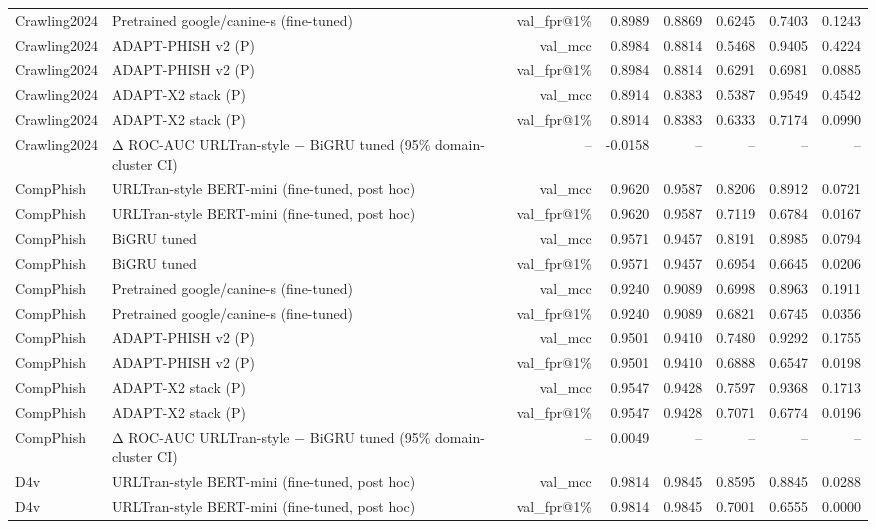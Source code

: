 \begin{table}[t]
\begin{tabular}{llrrrrrr}
Crawling2024 & Pretrained google/canine-s (fine-tuned) & val\_fpr@1\% & 0.8989 & 0.8869 & 0.6245 & 0.7403 & 0.1243 \\
Crawling2024 & ADAPT-PHISH v2 (P) & val\_mcc & 0.8984 & 0.8814 & 0.5468 & 0.9405 & 0.4224 \\
Crawling2024 & ADAPT-PHISH v2 (P) & val\_fpr@1\% & 0.8984 & 0.8814 & 0.6291 & 0.6981 & 0.0885 \\
Crawling2024 & ADAPT-X2 stack (P) & val\_mcc & 0.8914 & 0.8383 & 0.5387 & 0.9549 & 0.4542 \\
Crawling2024 & ADAPT-X2 stack (P) & val\_fpr@1\% & 0.8914 & 0.8383 & 0.6333 & 0.7174 & 0.0990 \\
Crawling2024 & Δ ROC-AUC URLTran-style − BiGRU tuned (95\% domain-cluster CI) & -- & -0.0158 & -- & -- & -- & -- \\
CompPhish & URLTran-style BERT-mini (fine-tuned, post hoc) & val\_mcc & 0.9620 & 0.9587 & 0.8206 & 0.8912 & 0.0721 \\
CompPhish & URLTran-style BERT-mini (fine-tuned, post hoc) & val\_fpr@1\% & 0.9620 & 0.9587 & 0.7119 & 0.6784 & 0.0167 \\
CompPhish & BiGRU tuned & val\_mcc & 0.9571 & 0.9457 & 0.8191 & 0.8985 & 0.0794 \\
CompPhish & BiGRU tuned & val\_fpr@1\% & 0.9571 & 0.9457 & 0.6954 & 0.6645 & 0.0206 \\
CompPhish & Pretrained google/canine-s (fine-tuned) & val\_mcc & 0.9240 & 0.9089 & 0.6998 & 0.8963 & 0.1911 \\
CompPhish & Pretrained google/canine-s (fine-tuned) & val\_fpr@1\% & 0.9240 & 0.9089 & 0.6821 & 0.6745 & 0.0356 \\
CompPhish & ADAPT-PHISH v2 (P) & val\_mcc & 0.9501 & 0.9410 & 0.7480 & 0.9292 & 0.1755 \\
CompPhish & ADAPT-PHISH v2 (P) & val\_fpr@1\% & 0.9501 & 0.9410 & 0.6888 & 0.6547 & 0.0198 \\
CompPhish & ADAPT-X2 stack (P) & val\_mcc & 0.9547 & 0.9428 & 0.7597 & 0.9368 & 0.1713 \\
CompPhish & ADAPT-X2 stack (P) & val\_fpr@1\% & 0.9547 & 0.9428 & 0.7071 & 0.6774 & 0.0196 \\
CompPhish & Δ ROC-AUC URLTran-style − BiGRU tuned (95\% domain-cluster CI) & -- & 0.0049 & -- & -- & -- & -- \\
D4v & URLTran-style BERT-mini (fine-tuned, post hoc) & val\_mcc & 0.9814 & 0.9845 & 0.8595 & 0.8845 & 0.0288 \\
D4v & URLTran-style BERT-mini (fine-tuned, post hoc) & val\_fpr@1\% & 0.9814 & 0.9845 & 0.7001 & 0.6555 & 0.0000 \\

\end{tabular}
\end{table}
